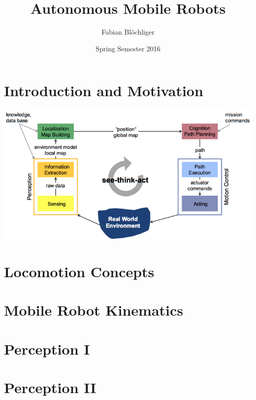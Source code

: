 \documentclass[8pt,landscape]{article}
\begin{document}
\renewcommand{\labelitemi}{--}
\pagestyle{empty}
\raggedright
\setlength{\columnsep}{2mm}
\setlength{\columnseprule}{0.1mm}
\begin{multicols}{3}
\title{\textbf{Autonomous Mobile Robots}}
\author{Fabian Blöchliger}
\date{Spring Semester 2016}
\maketitle


\section{Introduction and Motivation}

\includegraphics[width=\columnwidth]{img/1_SeeThinkAct.png}

\section{Locomotion Concepts}

\blindtext[3]

\section{Mobile Robot Kinematics}

\blindtext[3]

\section{Perception I}

\blindtext[3]

\section{Perception II}


\end{multicols}
\end{document}
